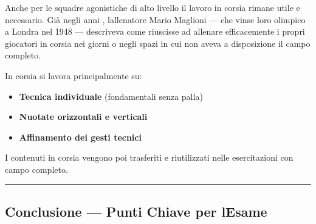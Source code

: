 \documentclass[a4paper,11pt]{article}
\providecommand{\tightlist}{%
  \setlength{\itemsep}{0pt}\setlength{\parskip}{0pt}}
\begin{document}
Anche per le squadre agonistiche di alto livello il lavoro in corsia
rimane utile e necessario. Già negli anni ,
l\textquotesingle allenatore Mario Maglioni --- che vinse
l\textquotesingle oro olimpico a Londra nel 1948 --- descriveva come
riuscisse ad allenare efficacemente i propri giocatori in corsia nei
giorni o negli spazi in cui non aveva a disposizione il campo completo.

In corsia si lavora principalmente su:

\begin{itemize}
      \tightlist
      \item
            \textbf{Tecnica individuale} (fondamentali senza palla)
      \item
            \textbf{Nuotate orizzontali e verticali}
      \item
            \textbf{Affinamento dei gesti tecnici}
\end{itemize}

I contenuti in corsia vengono poi trasferiti e riutilizzati nelle
esercitazioni con campo completo.

\begin{center}\rule{0.5\linewidth}{0.5pt}\end{center}

\subsection{Conclusione --- Punti Chiave per
      l\textquotesingle Esame}\label{conclusione-punti-chiave-per-lesame-10}
\end{document}
